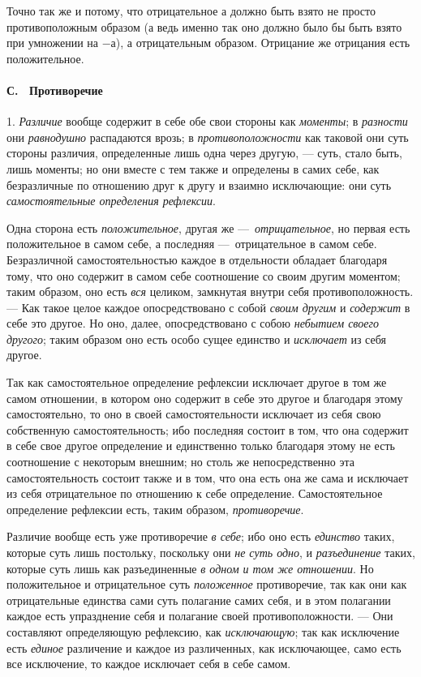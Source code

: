 Точно так же и  потому, что отрицательное $а$ должно
быть взято не просто противоположным образом (а ведь именно так оно должно
было бы быть взято при умножении на $-а$), а
отрицательным образом. Отрицание же отрицания есть положительное.

\paragraph[С. \ Противоречие]{С. \ Противоречие}
1. {\em Различие} вообще
содержит в себе обе свои стороны как {\em моменты}; в
{\em разности} они {\em равнодушно}
распадаются врозь; в {\em противоположности} как
таковой они суть стороны различия, определенные лишь одна через другую, —
суть, стало быть, лишь моменты; но они вместе с тем также и определены в
самих себе, как безразличные по отношению друг к другу и взаимно
исключающие: они суть {\em самостоятельные определения
рефлексии}.

Одна сторона есть {\em положительное}, другая же
—~{\em отрицательное}, но первая есть положительное в
самом себе, а последняя —~отрицательное в самом себе. Безразличной
самостоятельностью каждое в отдельности обладает благодаря тому, что оно
содержит в самом себе соотношение со своим другим моментом; таким образом,
оно есть {\em вся} целиком, замкнутая внутри себя
противоположность. — Как такое целое каждое опосредствовано с собой
{\em своим другим} и {\em содержит}
в себе это другое. Но оно, далее, опосредствовано с собою
{\em небытием своего другого}; таким образом оно есть
особо сущее единство и {\em исключает} из себя другое.

Так как самостоятельное определение рефлексии исключает другое в том же
самом отношении, в котором оно содержит в себе это другое и благодаря этому
самостоятельно, то оно в своей самостоятельности исключает из себя свою
собственную самостоятельность; ибо последняя состоит в том, что она
содержит в себе свое другое определение и единственно только благодаря
этому не есть соотношение с некоторым внешним; но столь же непосредственно
эта самостоятельность состоит также и в том, что она есть она же сама и
исключает из себя отрицательное по отношению к себе определение.
Самостоятельное определение рефлексии есть, таким образом,
{\em противоречие}.

Различие вообще есть уже противоречие {\em в себе}; ибо
оно есть {\em единство} таких, которые суть лишь
постольку, поскольку они {\em не суть одно}, и
{\em разъединение} таких, которые суть лишь как
разъединенные {\em в одном и том же отношении}. Но
положительное и отрицательное суть {\em положенное}
противоречие, так как они как отрицательные единства сами суть полагание
самих себя, и в этом полагании каждое есть упразднение себя и полагание
своей противоположности. — Они составляют определяющую рефлексию, как
{\em исключающую}; так как исключение есть
{\em единое} различение и каждое из различенных, как
исключающее, само есть все исключение, то каждое исключает себя в себе
самом.

